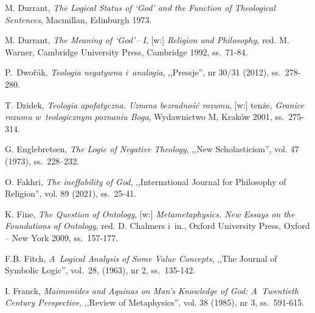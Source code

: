 \begin{thebibliography}{100}
M. Durrant, \textit{The Logical Status of ‘God' and the Function of Theological Sentences}, Macmillan, Edinburgh 1973.

M. Durrant, \textit{The Meaning of ‘God'– I}, [w:] \textit{Religion and Philosophy}, red. M. Warner, Cambridge University Press, Cambridge 1992, ss.~71-84.

P.~Dwořák, \textit{Teologia negatywna i~analogia}, ,,Pressje'', nr 30/31 (2012), ss.~278-280.

T. Dzidek, \textit{Teologia apofatyczna. Uznana bezradność rozumu}, [w:] tenże, \textit{Granice rozumu w~teologicznym poznaniu Boga}, Wydawnictwo M, Kraków 2001, ss.~275-314.

G. Englebretsen, \textit{The Logic of Negative Theology}, ,,New Scholasticism'', vol. 47 (1973), ss.~228--232.



O. Fakhri, \textit{The ineffability of God}, ,,International Journal for Philosophy of Religion'', vol. 89 (2021), ss.~25-41.

K. Fine, \textit{The Question of Ontology}, [w:] \textit{Metametaphysics. New Essays on the Foundations of Ontology},
red. D. Chalmers i~in., Oxford University Press, Oxford -- New York 2009, ss.~157-177.


F.B. Fitch, \textit{A~Logical Analysis of Some Value Concepts}, ,,The Journal of Symbolic Logic'', vol.~28, (1963), nr 2, ss.~135-142.

I. Franck, \textit{Maimonides and Aquinas on Man's Knowledge of God: A~Twentieth Century Perspective}, ,,Review of Metaphysics'', vol. 38 (1985), nr 3, ss.~591-615.


\end{thebibliography}

